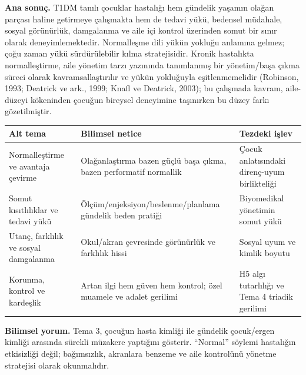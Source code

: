 \documentclass[
  turkish,
  a4paper,
  DIV=11,
  numbers=noendperiod]{scrreprt}
\newcounter{none} %
\begin{document}
\textbf{Ana sonuç.} T1DM tanılı çocuklar hastalığı hem gündelik yaşamın
olağan parçası haline getirmeye çalışmakta hem de tedavi yükü, bedensel
müdahale, sosyal görünürlük, damgalanma ve aile içi kontrol üzerinden
somut bir sınır olarak deneyimlemektedir. Normalleşme dili yükün yokluğu
anlamına gelmez; çoğu zaman yükü sürdürülebilir kılma stratejisidir.
Kronik hastalıkta normalleştirme, aile yönetim tarzı yazınında
tanımlanmış bir yönetim/başa çıkma süreci olarak kavramsallaştırılır ve
yükün yokluğuyla eşitlenmemelidir (Robinson, 1993; Deatrick ve ark.,
1999; Knafl ve Deatrick, 2003); bu çalışmada kavram, aile-düzeyi
kökeninden çocuğun bireysel deneyimine taşınırken bu düzey farkı
gözetilmiştir.

{\def\LTcaptype{none} %
\begin{longtable}[]{@{}
  >{\raggedright\arraybackslash}p{}
  >{\raggedright\arraybackslash}p{}
  >{\raggedright\arraybackslash}p{}@{}}
\toprule\noalign{}
\begin{minipage}[b]{\linewidth}\raggedright
Alt tema
\end{minipage} & \begin{minipage}[b]{\linewidth}\raggedright
Bilimsel netice
\end{minipage} & \begin{minipage}[b]{\linewidth}\raggedright
Tezdeki işlev
\end{minipage} \\
\midrule\noalign{}
\endhead
\bottomrule\noalign{}
\endlastfoot
Normalleştirme ve avantaja çevirme & Olağanlaştırma bazen güçlü başa
çıkma, bazen performatif normallik & Çocuk anlatısındaki direnç-uyum
birlikteliği \\
Somut kısıtlılıklar ve tedavi yükü & Ölçüm/enjeksiyon/beslenme/planlama
gündelik beden pratiği & Biyomedikal yönetimin somut yükü \\
Utanç, farklılık ve sosyal damgalanma & Okul/akran çevresinde görünürlük
ve farklılık hissi & Sosyal uyum ve kimlik boyutu \\
Korunma, kontrol ve kardeşlik & Artan ilgi hem güven hem kontrol; özel
muamele ve adalet gerilimi & H5 algı tutarlılığı ve Tema 4 triadik
gerilimi \\
\end{longtable}
}

\textbf{Bilimsel yorum.} Tema 3, çocuğun hasta kimliği ile gündelik
çocuk/ergen kimliği arasında sürekli müzakere yaptığını gösterir.
``Normal'' söylemi hastalığın etkisizliği değil; bağımsızlık, akranlara
benzeme ve aile kontrolünü yönetme stratejisi olarak okunmalıdır.
\end{document}
